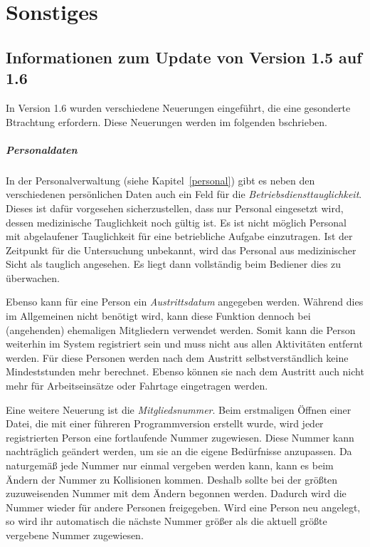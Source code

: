 \chapter{Sonstiges}\label{sonstiges}
\section{Informationen zum Update von Version 1.5 auf 1.6}
\label{sonstiges:1.5-1.6}
In Version 1.6 wurden verschiedene Neuerungen eingeführt, die eine gesonderte Btrachtung erfordern.
Diese Neuerungen werden im folgenden bschrieben.


\paragraph{Personaldaten}
In der Personalverwaltung (siehe Kapitel~\ref{personal}) gibt es neben den verschiedenen persönlichen Daten auch ein Feld für die \emph{Betriebsdiensttauglichkeit}.
Dieses ist dafür vorgesehen sicherzustellen, dass nur Personal eingesetzt wird, dessen medizinische Tauglichkeit noch gültig ist.
Es ist nicht möglich Personal mit abgelaufener Tauglichkeit für eine betriebliche Aufgabe einzutragen.
Ist der Zeitpunkt für die Untersuchung unbekannt, wird das Personal aus medizinischer Sicht als tauglich angesehen.
Es liegt dann vollständig beim Bediener dies zu überwachen.

Ebenso kann für eine Person ein \emph{Austrittsdatum} angegeben werden.
Während dies im Allgemeinen nicht benötigt wird, kann diese Funktion dennoch bei (angehenden) ehemaligen Mitgliedern verwendet werden.
Somit kann die Person weiterhin im System registriert sein und muss nicht aus allen Aktivitäten entfernt werden.
Für diese Personen werden nach dem Austritt selbstverständlich keine Mindeststunden mehr berechnet.
Ebenso können sie nach dem Austritt auch nicht mehr für Arbeitseinsätze oder Fahrtage eingetragen werden.

Eine weitere Neuerung ist die \emph{Mitgliedsnummer}.
Beim erstmaligen Öffnen einer Datei, die mit einer führeren Programmversion erstellt wurde, wird jeder registrierten Person eine fortlaufende Nummer zugewiesen.
Diese Nummer kann nachträglich geändert werden, um sie an die eigene Bedürfnisse anzupassen.
Da naturgemäß jede Nummer nur einmal vergeben werden kann,
kann es beim Ändern der Nummer zu Kollisionen kommen.
Deshalb sollte bei der größten zuzuweisenden Nummer mit dem Ändern begonnen werden.
Dadurch wird die Nummer wieder für andere Personen freigegeben.
Wird eine Person neu angelegt,
so wird ihr automatisch die nächste Nummer größer als die aktuell größte vergebene Nummer zugewiesen.



